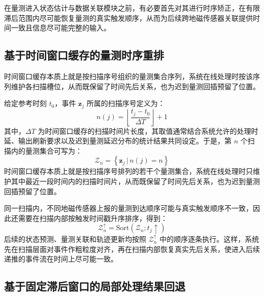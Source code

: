 \documentclass{xdupgthesis}
\begin{document}
在量测进入状态估计与数据关联模块之前，有必要首先对其进行时序矫正，在有限滞后范围内尽可能恢复量测的真实触发顺序，从而为后续跨地磁传感器关联提供时间一致且信息尽可能完整的输入。

\subsection{基于时间窗口缓存的量测时序重排}

时间窗口缓存本质上就是按扫描序号组织的量测集合序列，系统在线处理时按该序列维护各扫描槽位，从而既保留了时间先后关系，也为迟到量测回插预留了位置。

给定参考时刻 $t_0$，事件 $\mathbf z_j$ 所属的扫描序号定义为：
\begin{equation}
	n(j)=\left\lfloor \frac{t_j-t_0}{\Delta T} \right\rfloor +1
	\label{eq:ch3_scan_index}
\end{equation}
其中，$\Delta T$ 为时间窗口缓存的扫描时间片长度，其取值通常结合系统允许的处理时延、输出刷新要求以及迟到量测延迟分布的统计结果共同设定。于是，第 $n$ 个扫描内的量测集合可写为：
\begin{equation}
	\mathcal Z_n=
	\left\{
	\mathbf z_j\,\big|\, n(j)=n
	\right\}
	\label{eq:ch3_scan_set}
\end{equation}
时间窗口缓存本质上就是按扫描序号排列的若干个量测集合，系统在线处理时只维护其中最近一段时间内的扫描时间片，从而既保留了时间先后关系，也为迟到量测回插预留了位置。

同一扫描内，不同地磁传感器上报的量测到达顺序可能与真实触发顺序不一致，因此还需要在扫描内部按触发时间戳升序排序，得到：
\begin{equation}
	\mathcal Z_n^{\uparrow}=\mathrm{Sort}\left(\mathcal Z_n; t_j\uparrow\right)
	\label{eq:ch3_scan_sort}
\end{equation}
后续的状态预测、量测关联和轨迹更新均按照 $\mathcal Z_n^{\uparrow}$ 中的顺序逐条执行。这样，系统先在扫描层面对事件作粗粒度对齐，再在扫描内部恢复真实先后关系，使进入后续递推的事件流在时间上尽可能一致。

\subsection{基于固定滞后窗口的局部处理结果回退}
\end{document}
